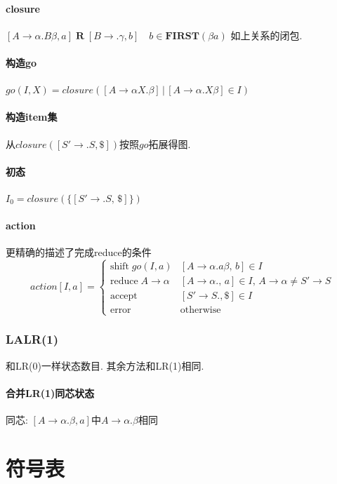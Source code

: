 \documentclass{ctexart}
\begin{document}
\paragraph{closure} $[A \to \alpha . B \beta, a]  \; \mathbf{R} \;  [B \to .\gamma, b] \quad b \in \mathbf{FIRST}(\beta a)$
    如上关系的闭包.
\paragraph{构造go} $go(I, X) = closure([A \to \alpha X. \beta] \,|\, [A \to \alpha . X \beta] \in I)$
\paragraph{构造item集} 从$closure([S' \to .S, \$])$按照$go$拓展得图.
\paragraph{初态} $I_0 = closure(\{[S' \to .S,\, \$]\})$
\paragraph{action} 更精确的描述了完成reduce的条件
%
%
    \[ action[I, a] = \begin{cases}
        \text{shift}\; go(I, a)    & [A \to \alpha .a \beta,\, b] \in I\\
        \text{reduce}\; A\to\alpha & [A \to \alpha.,\, a] \in I,\, A\to\alpha \neq S'\to S\\
        \text{accept}              & [S' \to S., \$] \in I\\
        \text{error}               & \text{otherwise}\end{cases} \]

\subsubsection{LALR(1)}
    和LR(0)一样状态数目.
    其余方法和LR(1)相同.
\paragraph{合并LR(1)同芯状态} 同芯: $[A\to\alpha.\beta, a]$中$A\to\alpha.\beta$相同


\section{符号表}
\end{document}
